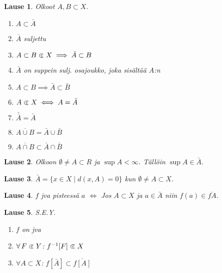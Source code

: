 \documentclass[landscape,a4paper,10pt]{article}
\newcommand\cls{\mathrel{\ooalign{$\subset$\cr
\hidewidth\raise.225ex\hbox{$\text{{\scriptsize c}}\mkern2mu$}\cr}}}
\theoremstyle{customtheoremstyle}
\newtheorem*{theorem}{Lause}
\begin{document}
\begin{multicols*}{3}
\begin{theorem}
  Olkoot $A,B \subset X$.
  \begin{enumerate}
    \item[(1)]{$A \subset \bar{A}$}
    \item[(2)]{$\bar{A}$ suljettu}
    \item[(3)]{$A \subset B \cls X \implies \bar{A} \subset B$}
    \item[(4)]{$\bar{A}$ on suppein sulj. osajoukko, joka sisältää $A$:n}
    \item[(5)]{$A \subset B \implies \bar{A} \subset \bar{B}$}
    \item[(6)]{$A \cls X \iff A = \bar{A}$}
    \item[(7)]{$\bar{\bar{A}} = \bar{A}$}
    \item[(8)]{$\overline{A \cup B} = \bar{A} \cup \bar{B}$}
    \item[(9)]{$\overline{A \cap B} \subset \bar{A} \cap \bar{B}$}
  \end{enumerate}
\end{theorem}

\begin{theorem}
  Olkoon $\emptyset \neq A \subset R$ ja $\sup A < \infty$. Tällöin $\sup A \in
  \bar{A}$.
\end{theorem}

\begin{theorem}
  $\bar{A} = \{ x \in X \; | \; d(x,A) = 0 \}$ kun $\emptyset \neq A \subset X$.
\end{theorem}

\begin{theorem}
  $f$ jva pisteessä $a$ $\iff$ Jos $A \subset X$ ja $a \in \bar{A}$ niin
  $f(a) \in \overline{fA}$.
\end{theorem}

\begin{theorem}
  S.E.Y.
  \begin{enumerate}
    \item[(1)]{$f$ on jva}
    \item[(2)]{$\forall \, F \cls Y$: $f^{-1}[F] \cls X$ }
    \item[(3)]{$\forall A \subset X$: $f[\bar{A}] \subset \overline{f[A]}$}
  \end{enumerate}
\end{theorem}
\end{multicols*}
\end{document}
